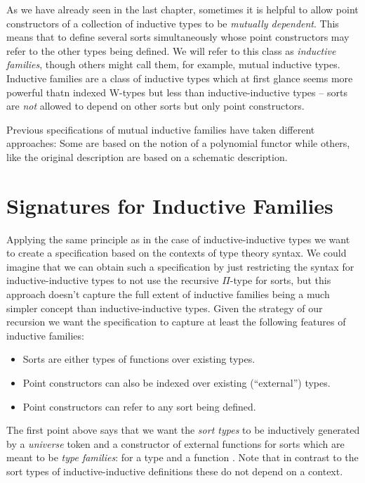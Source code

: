 
As we have already seen in the last chapter, sometimes it is helpful to allow
point constructors of a collection of inductive types to be \emph{mutually dependent}.
This means that to define several sorts simultaneously whose point constructors
may refer to the other types being defined.
We will refer to this class as \emph{inductive families}, though others might
call them, for example, mutual inductive types.
Inductive families are a class of inductive types which at first glance seems more
powerful thatn indexed W-types but less than inductive-inductive types --
sorts are \emph{not} allowed to depend on other sorts but only point constructors.

Previous specifications of mutual inductive families have taken different approaches:
Some are based on the notion of a polynomial functor while others, like
the original \citet{dybjer94} description are based on a schematic description.


\section{Signatures for Inductive Families}

Applying the same principle as in the case of inductive-inductive types we want
to create a specification based on the contexts of type theory syntax.
We could imagine that we can obtain such a specification by just restricting the
syntax for inductive-inductive types to not use the recursive $\Pi$-type for sorts,
but this approach doesn't capture the full %
extent of inductive families being a much simpler concept than inductive-inductive
types.
Given the strategy of our recursion we want the specification to capture at least
the following features of inductive families:
\begin{itemize}
\item Sorts are either types of functions over existing types.
\item Point constructors can also be indexed over existing (``external'') types.
\item Point constructors can refer to any sort being defined.
\end{itemize}

The first point above says that we want the \emph{sort types} \blm{\tqm{\Sc}}
to be inductively generated by a \emph{universe} token \tqm{\UU :: \Sc} and a constructor
of external functions for sorts which are meant to be \emph{type families}:
 for a type  and a function
.
Note that in contrast to the sort types of inductive-inductive definitions these
do not depend on a context.

